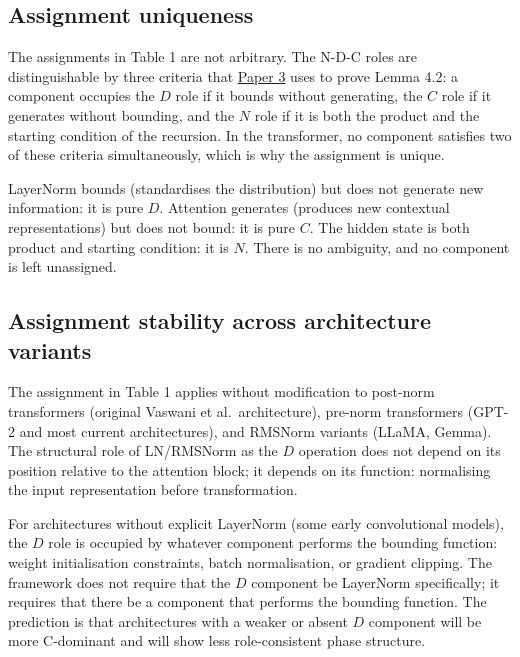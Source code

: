 \documentclass[12pt]{article}
\begin{document}
\subsection{Assignment uniqueness}\label{assignment-uniqueness}

The assignments in Table 1 are not arbitrary. The N-D-C roles are
distinguishable by three criteria that
\href{https://github.com/baardev/truevalue/blob/main/docnav/Research/papers/3_minimal-recursive-triadic-framework/3_minimal-recursive-triadic-framework.pdf}{Paper
3} uses to prove Lemma 4.2: a component occupies the \(D\) role if it
bounds without generating, the \(C\) role if it generates without
bounding, and the \(N\) role if it is both the product and the starting
condition of the recursion. In the transformer, no component satisfies
two of these criteria simultaneously, which is why the assignment is
unique.

LayerNorm bounds (standardises the distribution) but does not generate
new information: it is pure \(D\). Attention generates (produces new
contextual representations) but does not bound: it is pure \(C\). The
hidden state is both product and starting condition: it is \(N\). There
is no ambiguity, and no component is left unassigned.

\subsection{Assignment stability across architecture variants}\label{assignment-stability-across-architecture-variants}

The assignment in Table 1 applies without modification to post-norm
transformers (original Vaswani et al.~architecture), pre-norm
transformers (GPT-2 and most current architectures), and RMSNorm
variants (LLaMA, Gemma). The structural role of LN/RMSNorm as the \(D\)
operation does not depend on its position relative to the attention
block; it depends on its function: normalising the input representation
before transformation.

For architectures without explicit LayerNorm (some early convolutional
models), the \(D\) role is occupied by whatever component performs the
bounding function: weight initialisation constraints, batch
normalisation, or gradient clipping. The framework does not require that
the \(D\) component be LayerNorm specifically; it requires that there be
a component that performs the bounding function. The prediction is that
architectures with a weaker or absent \(D\) component will be more
C-dominant and will show less role-consistent phase structure.
\end{document}
